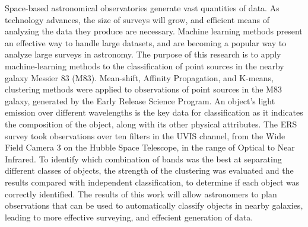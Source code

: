 ﻿%
Space-based astronomical observatories generate vast quantities of data.
As technology advances, the size of surveys will grow, and efficient means of analyzing the data they produce are necessary.
Machine learning methods present an effective way to handle large datasets, and are becoming a popular way to analyze large surveys in astronomy. 
The purpose of this research is to apply machine-learning methods to the classification of point sources in the nearby galaxy Messier 83 (M83).
Mean-shift, Affinity Propagation, and K-means, clustering methods were applied to observations of point sources in the M83 galaxy, generated by the Early Release Science Program. 
An object’s light emission over different wavelengths is the key data for classification as it indicates the composition of the object, along with its other physical attributes.
The ERS survey took observations over ten filters in the UVIS channel, from the Wide Field Camera 3 on the Hubble Space Telescope, in the range of Optical to Near Infrared. 
To identify which combination of bands was the best at separating different classes of objects, the strength of the clustering was evaluated and the results compared with independent classification, to determine if each object was correctly identified.
The results of this work will allow astronomers to plan observations that can be used to automatically classify objects in nearby galaxies, leading to more effective surveying, and effecient generation of data.  